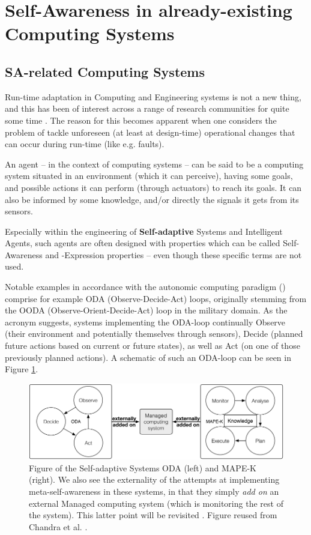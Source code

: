 \section{Self-Awareness in already-existing Computing Systems}

	\subsection{SA-related Computing Systems}
	Run-time adaptation in Computing and Engineering systems is not a new thing, and this has been of interest across a range of research communities for quite some time \cite{sacs16_ch4}. The reason for this becomes apparent when one considers the problem of tackle unforeseen (at least at design-time) operational changes that can occur during run-time (like e.g. faults).

	An agent -- in the context of computing systems -- can be said to be a computing system situated in an environment (which it can perceive), having some goals, and possible actions it can perform (through actuators) to reach its goals. It can also be informed by some knowledge, and/or directly the signals it gets from its sensors.

	Especially within the engineering of \textbf{Self-adaptive} Systems and Intelligent Agents, such agents are often designed with properties which can be called Self-Awareness and -Expression properties -- even though these specific terms are not used.

	Notable examples in accordance with the autonomic computing paradigm (\cite{sacs16_ch4}) comprise for example ODA (Observe-Decide-Act) loops, originally stemming from the OODA (Observe-Orient-Decide-Act) loop in the military domain. As the acronym suggests, systems implementing the ODA-loop continually Observe (their environment and potentially themselves through sensors), Decide (planned future actions based on current or future states), as well as Act (on one of those previously planned actions). A schematic of such an ODA-loop can be seen in Figure \ref{fig:oda_mapek}.

	\begin{figure}[ht]
	\centering
	\includegraphics[width=\columnwidth]{Assets/DocSegments/Chapters/Background/Figures/Schema/oda_mapek.PNG}
	\caption{Figure of the Self-adaptive Systems ODA (left) and MAPE-K (right). We also see the externality of the attempts at implementing meta-self-awareness in these systems, in that they simply \textit{add on} an external Managed computing system (which is monitoring the rest of the system). This latter point will be revisited . Figure reused from Chandra et al. \cite{sacs16_ch4}.}
	\label{fig:oda_mapek}
	\end{figure}


